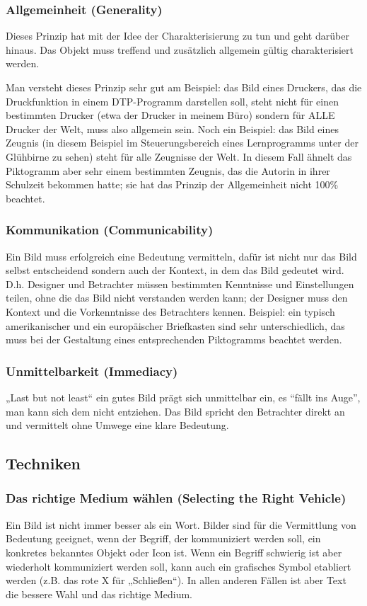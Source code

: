 \subsubsection*{Allgemeinheit (Generality)}
Dieses Prinzip hat mit der Idee der Charakterisierung zu tun und geht darüber hinaus. Das Objekt muss treffend und zusätzlich allgemein gültig charakterisiert werden.

Man versteht dieses Prinzip sehr gut am Beispiel: das Bild eines Druckers, das die Druckfunktion in einem DTP-Programm darstellen soll, steht nicht für einen bestimmten Drucker (etwa der Drucker in meinem Büro) sondern für ALLE Drucker der Welt, muss also allgemein sein. 
Noch ein Beispiel: das Bild eines Zeugnis (in diesem Beispiel im Steuerungsbereich eines Lernprogramms unter der Glühbirne zu sehen) steht für alle Zeugnisse der Welt. In diesem Fall ähnelt das Piktogramm aber sehr einem bestimmten Zeugnis, das die Autorin in ihrer Schulzeit bekommen hatte; sie hat das Prinzip der Allgemeinheit nicht 100\% beachtet.


\subsubsection*{Kommunikation (Communicability)}
Ein Bild muss erfolgreich eine Bedeutung vermitteln, dafür ist nicht nur das Bild selbst entscheidend sondern auch der Kontext, in dem das Bild gedeutet wird. D.h. Designer und Betrachter müssen bestimmten Kenntnisse und Einstellungen teilen, ohne die das Bild nicht verstanden werden kann; der Designer muss den Kontext und die Vorkenntnisse des Betrachters kennen.
Beispiel: ein typisch amerikanischer und ein europäischer Briefkasten sind sehr unterschiedlich, das muss bei der Gestaltung eines entsprechenden Piktogramms beachtet werden.

\subsubsection*{Unmittelbarkeit (Immediacy)}
„Last but not least“ ein gutes Bild prägt sich unmittelbar ein, es “fällt ins Auge”, man kann sich dem nicht entziehen. Das Bild spricht den Betrachter direkt an und vermittelt ohne Umwege eine klare Bedeutung. 

\subsection{Techniken}
\subsubsection*{Das richtige Medium wählen (Selecting the Right Vehicle)}
Ein Bild ist nicht immer besser als ein Wort. Bilder sind für die Vermittlung von Bedeutung geeignet, wenn der Begriff, der kommuniziert werden soll, ein konkretes bekanntes Objekt oder Icon ist. Wenn ein Begriff schwierig ist aber wiederholt kommuniziert werden soll, kann auch ein grafisches Symbol etabliert werden (z.B. das rote X für „Schließen“).
In allen anderen Fällen ist aber Text die bessere Wahl und das richtige Medium.
 
